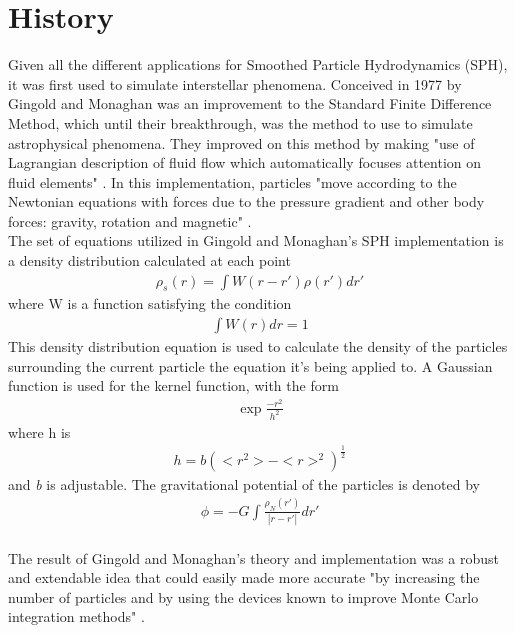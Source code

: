 \documentclass{sigchi}
\begin{document}
\section{History}
%
\hspace{6 pt} Given all the different applications for Smoothed Particle Hydrodynamics (SPH),
it was first used to simulate interstellar phenomena. Conceived in 1977 by Gingold and 
Monaghan was an improvement to the Standard Finite Difference Method, which until their 
breakthrough, was the method to use to simulate astrophysical phenomena. They improved 
on this method by making "use of Lagrangian description of fluid flow which automatically 
focuses attention on fluid elements" \cite{sphastrophysics}. In this implementation, particles 
"move according to the Newtonian equations with forces due to the pressure gradient and 
other body forces: gravity, rotation and magnetic" \cite{sphastrophysics}.
\\
\hspace*{6 pt} The set of equations utilized in Gingold and Monaghan's SPH implementation 
is a density distribution calculated at each point
\begin{align}
	\rho_s(r) = \int W(r - r') \rho(r') dr'
\end{align}
where W is a function satisfying the condition
\begin{align}
\int W(r) dr = 1
\end{align}
\hspace*{6 pt} This density distribution equation is used to calculate the density of the 
particles surrounding the current particle the equation it's being applied to.
\hspace*{6 pt} A Gaussian function is used for the kernel function, with the form
\begin{align}
\exp{\frac{-r^2}{h^2}}
\end{align}
where h is
\begin{align}
h = b(<r^2> - <r>^2)^\frac{1}{2}
\end{align}
and \textit{b} is adjustable.
\hspace*{6 pt} The gravitational potential of the particles is denoted by
\begin{align}
\phi = - G \int \frac{\rho_N(r')}{|r - r'|} dr'
\end{align}
\\
\hspace*{6 pt} The result of Gingold and Monaghan's theory and implementation was a robust 
and extendable idea that could easily made more accurate "by increasing the number of particles 
and by using the devices known to improve Monte Carlo integration methods" \cite{sphastrophysics}.
%
\end{document}
